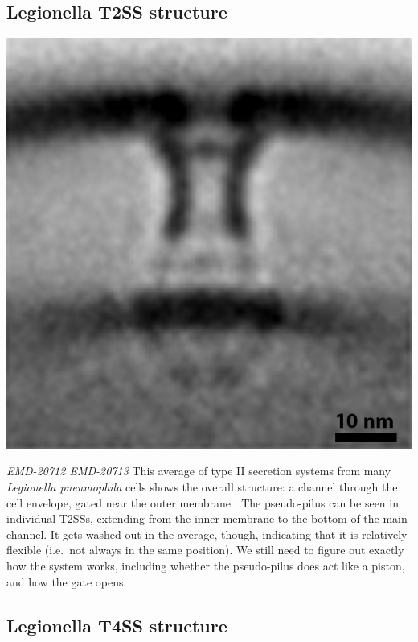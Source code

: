 \documentclass[]{tufte-book}
\begin{document}
\subsection{Legionella T2SS structure}\label{Legionella_T2SS_structure}

\includegraphics{img/schematics/9_3_1}

\emph{EMD-20712 EMD-20713} This average of type II secretion systems
from many \emph{Legionella pneumophila} cells shows the overall
structure: a channel through the cell envelope, gated near the outer
membrane \citep{ghosal2019}. The pseudo-pilus can be seen in individual
T2SSs, extending from the inner membrane to the bottom of the main
channel. It gets washed out in the average, though, indicating that it
is relatively flexible (i.e.~not always in the same position). We still
need to figure out exactly how the system works, including whether the
pseudo-pilus does act like a piston, and how the gate opens.

\subsection{Legionella T4SS structure}\label{Legionella_T4SS_structure}
\end{document}
